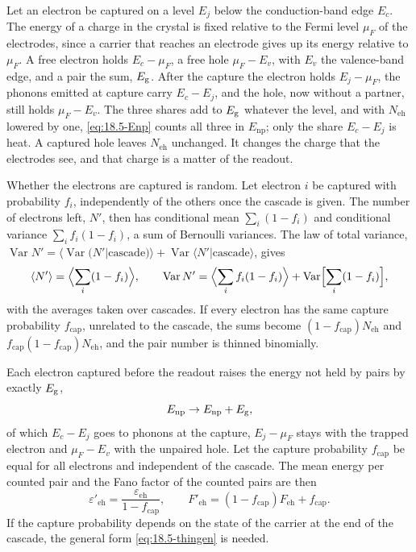 Let an electron be captured on a level $E_j$ below the conduction-band edge $E_c$. The energy of a charge in the crystal is fixed relative to the Fermi level $\mu_F$ of the electrodes, since a carrier that reaches an electrode gives up its energy relative to $\mu_F$. A free electron holds $E_c - \mu_F$, a free hole $\mu_F - E_v$, with $E_v$ the valence-band edge, and a pair the sum, $E_{\mathrm{g}}$. After the capture the electron holds $E_j - \mu_F$, the phonons emitted at capture carry $E_c - E_j$, and the hole, now without a partner, still holds $\mu_F - E_v$. The three shares add to $E_{\mathrm{g}}$ whatever the level, and with $N_{\mathrm{eh}}$ lowered by one, \cref{eq:18.5-Enp} counts all three in $E_{\mathrm{np}}$; only the share $E_c - E_j$ is heat. A captured hole leaves $N_{\mathrm{eh}}$ unchanged. It changes the charge that the electrodes see, and that charge is a matter of the readout.

Whether the electrons are captured is random. Let electron $i$ be captured with probability $f_i$, independently of the others once the cascade is given. The number of electrons left, $N'$, then has conditional mean $\sum_i(1 - f_i)$ and conditional variance $\sum_if_i(1 - f_i)$, a sum of Bernoulli variances. The law of total variance, $\operatorname{Var}N' = \langle\operatorname{Var}(N'|\text{cascade})\rangle + \operatorname{Var}\langle N'|\text{cascade}\rangle$, gives
\begin{equation}
  \langle N'\rangle = \Bigl\langle\sum_i(1 - f_i)\Bigr\rangle , \qquad
  \operatorname{Var}N' = \Bigl\langle\sum_if_i(1 - f_i)\Bigr\rangle + \operatorname{Var}\Bigl[\sum_i(1 - f_i)\Bigr] ,
  \label{eq:18.5-thingen}
\end{equation}
with the averages taken over cascades. If every electron has the same capture probability $f_{\mathrm{cap}}$, unrelated to the cascade, the sums become $(1 - f_{\mathrm{cap}})N_{\mathrm{eh}}$ and $f_{\mathrm{cap}}(1 - f_{\mathrm{cap}})N_{\mathrm{eh}}$, and the pair number is thinned binomially.

\begin{keyresult}
Each electron captured before the readout raises the energy not held by pairs by exactly $E_{\mathrm{g}}$,
\begin{equation}
  E_{\mathrm{np}} \to E_{\mathrm{np}} + E_{\mathrm{g}} ,
  \label{eq:18.5-Eg}
\end{equation}
of which $E_c - E_j$ goes to phonons at the capture, $E_j - \mu_F$ stays with the trapped electron and $\mu_F - E_v$ with the unpaired hole. Let the capture probability $f_{\mathrm{cap}}$ be equal for all electrons and independent of the cascade. The mean energy per counted pair and the Fano factor of the counted pairs are then
\begin{equation}
  \varepsilon'_{\mathrm{eh}} = \frac{\varepsilon_{\mathrm{eh}}}{1 - f_{\mathrm{cap}}} , \qquad
  F'_{\mathrm{eh}} = (1 - f_{\mathrm{cap}})F_{\mathrm{eh}} + f_{\mathrm{cap}} .
  \label{eq:18.5-thin}
\end{equation}
If the capture probability depends on the state of the carrier at the end of the cascade, the general form \cref{eq:18.5-thingen} is needed.
\end{keyresult}

